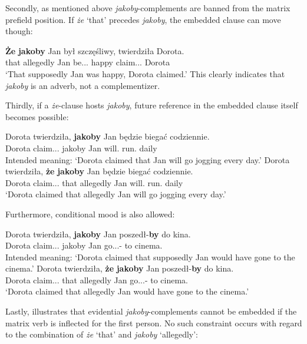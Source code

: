 \documentclass[output=paper
,modfonts
,nonflat]{langsci/langscibook}
\begin{document}
\noindent  Secondly, as mentioned above \emph{jakoby}-complements are banned from the matrix prefield position. If \emph{że} `that' precedes \emph{jakoby}, the embedded clause can move though:

\ea \gll \textbf{Że} \textbf{jakoby} Jan był szczęśliwy, twierdziła Dorota. \\
		 that allegedly Jan be.{\lptcp}.{\sg}.{\masc} happy  claim.{\lptcp}.{\sg}.{\fem} Dorota \\
\glt	`That supposedly Jan was happy, Dorota claimed.'
\z
This clearly indicates that \emph{jakoby} is an adverb, not a complementizer.

\noindent  Thirdly, if a \emph{że}-clause hosts \emph{jakoby}, future reference in the embedded clause itself becomes possible:

\ea \ea \gll 	*Dorota twierdziła, \textbf{jakoby} Jan będzie biegać codziennie. \\
		Dorota claim.{\lptcp}.{\sg}.{\fem} jakoby Jan will.{\thirdperson}{\sg} run.{\infv} daily \\
	\glt	Intended meaning: `Dorota claimed that Jan will go jogging every day.'
	\ex\gll	Dorota twierdziła, \textbf{że} \textbf{jakoby} Jan będzie biegać codziennie. \\
		Dorota claim.{\lptcp}.{\sg}.{\fem} that allegedly Jan will.{\thirdperson}{\sg} run.{\infv} daily \\
	\glt	`Dorota claimed that allegedly Jan will go jogging every day.'
\z\z

\noindent  Furthermore, conditional mood is also allowed:

\ea \ea \gll		*Dorota twierdziła, \textbf{jakoby} Jan poszedł-\textbf{by} do kina. \\
 			Dorota claim.{\lptcp}.{\sg}.{\fem} jakoby Jan go.{\lptcp}.{\sg}.{\masc}-{\subj} to cinema.{\gen} \\
	\glt		Intended meaning: `Dorota claimed that supposedly Jan would have gone to the cinema.'
	\ex\gll		Dorota twierdziła, \textbf{że} \textbf{jakoby} Jan poszedł-\textbf{by} do kina. \\
 			Dorota claim.{\lptcp}.{\sg}.{\fem} that allegedly Jan go.{\lptcp}.{\sg}.{\masc}-{\subj} to cinema.{\gen} \\
	\glt		`Dorota claimed that allegedly Jan would have gone to the cinema.'
\z\z

\noindent  Lastly,  illustrates that evidential \emph{jakoby}-complements cannot be embedded if the matrix verb is inflected for the first person. No such constraint occurs with regard to the combination of \emph{że} `that' and \emph{jakoby} `allegedly':
\end{document}
